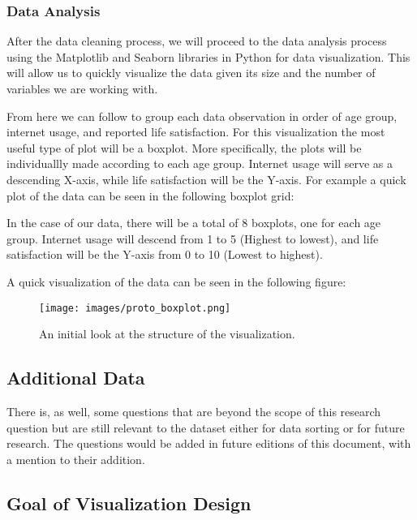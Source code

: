 \documentclass[12pt, a4paper]{article}
\begin{document}
\subsubsection{Data Analysis}
\par After the data cleaning process, we will proceed to the data analysis process using the Matplotlib and Seaborn libraries in Python for data visualization.
This will allow us to quickly visualize the data given its size and the number of variables we are working with.
\par From here we can follow to group each data observation in order of age group, internet usage, and reported life satisfaction.
For this visualization the most useful type of plot will be a boxplot.
More specifically, the plots will be individuallly made according to each age group.
Internet usage will serve as a descending X-axis, while life satisfaction will be the Y-axis.
For example a quick plot of the data can be seen in the following boxplot grid:
\par In the case of our data, there will be a total of 8 boxplots, one for each age group.
Internet usage will descend from 1 to 5 {\footnotesize(Highest to lowest)},
and life satisfaction will be the Y-axis from 0 to 10 {\footnotesize(Lowest to highest)}.
\par A quick visualization of the data can be seen in the following figure:

\begin{figure}[!h]
    \centering
    \texttt{[image: images/proto\_boxplot.png]}
    \caption{An initial look at the structure of the visualization.}
\end{figure}

\newpage

\subsection{Additional Data}
\par There is, as well, some questions that are beyond the scope of this research question but are still relevant to the dataset either for data sorting or for future research.
The questions would be added in future editions of this document, with a mention to their addition.

\subsection{Goal of Visualization Design}
\end{document}
